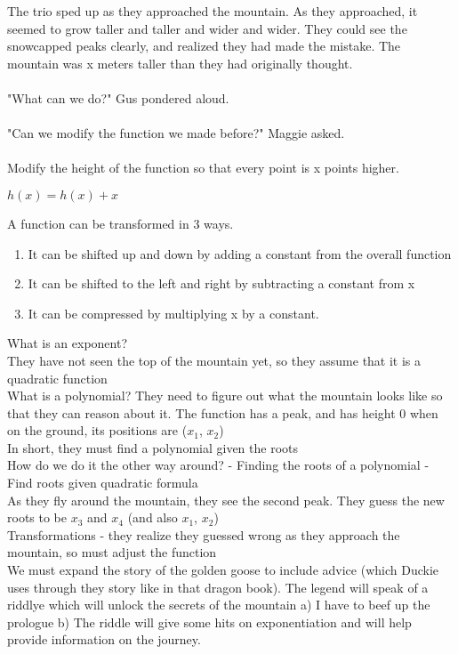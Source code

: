 { The trio sped up as they approached the mountain. As they approached, it seemed to grow taller and taller and wider and wider. 
	They could see the snowcapped peaks clearly, and realized they had made the mistake. 
	The mountain was x meters taller than they had originally thought. 
	\paragraph{} "What can we do?" Gus pondered aloud.
	\paragraph{} "Can we modify the function we made before?" Maggie asked.
	\paragraph{} Modify the height of the function so that every point is x points higher.
}
{
	$h(x) = h(x) + x$
}
{ A function can be transformed in 3 ways.
	\begin{enumerate}
		\item It can be shifted up and down by adding a constant from the overall function
		\item It can be shifted to the left and right by subtracting a constant from x
		\item It can be compressed by multiplying x by a constant.
	\end{enumerate}
}
{}

What is an exponent?\\
They have not seen the top of the mountain yet, so they assume that it is a quadratic function\\
What is a polynomial? They need to figure out what the mountain looks like so that they can reason about it. The function has a peak, and has height 0 when on the ground, its positions are ($x_1$, $x_2$)\\
\indent In short, they must find a polynomial given the roots \\
How do we do it the other way around? - Finding the roots of a polynomial - Find roots given quadratic formula\\
As they fly around the mountain, they see the second peak. They guess the new roots to be $x_3$ and $x_4$ (and also $x_1$, $x_2$)\\
Transformations - they realize they guessed wrong as they approach the mountain, so must adjust the function\\
We must expand the story of the golden goose to include advice (which Duckie uses through they story like in that dragon book). The legend will speak of a riddlye which will unlock the secrets of the mountain a)  I have to beef up the prologue b) The riddle will give some hits on exponentiation and will help provide information on the journey.
\pagebreak